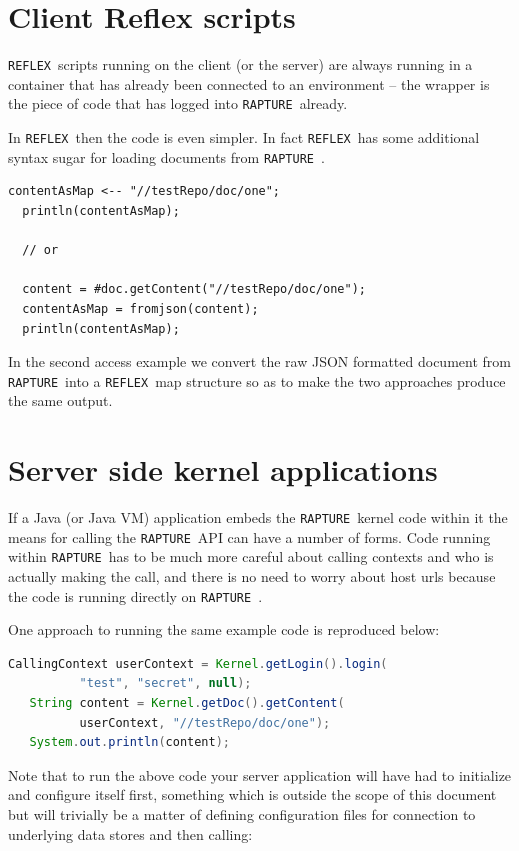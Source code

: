 \documentclass[12pt,twoside,a4paper]{book}
\newcommand{\Rapture}{\Verb+RAPTURE+~}
\newcommand{\Reflex}{\Verb+REFLEX+~}
\begin{document}
\section{Client Reflex scripts}

\Reflex scripts running on the client (or the server) are always running in a
container that has already been connected to an environment -- the wrapper is
the piece of code that has logged into \Rapture already.

In \Reflex then the code is even simpler. In fact \Reflex has some additional
syntax sugar for loading documents from \Rapture.

\begin{lstlisting}[caption={Reflex simple example}, language=reflex]
  contentAsMap <-- "//testRepo/doc/one";
  println(contentAsMap);

  // or

  content = #doc.getContent("//testRepo/doc/one");
  contentAsMap = fromjson(content);
  println(contentAsMap);
\end{lstlisting}

In the second access example we convert the raw JSON formatted document from
\Rapture into a \Reflex map structure so as to make the two approaches produce
the same output.

\section{Server side kernel applications}

If a Java (or Java VM) application embeds the \Rapture kernel code within it the
means for calling the \Rapture API can have a number of forms. Code running within
\Rapture has to be much more careful about calling contexts and who is actually
making the call, and there is no need to worry about host urls because the code
is running directly on \Rapture.

One approach to running the same example code is reproduced below:

\begin{lstlisting}[caption={Kernel simple example}, language=Java]
   CallingContext userContext = Kernel.getLogin().login(
          "test", "secret", null);
   String content = Kernel.getDoc().getContent(
          userContext, "//testRepo/doc/one");
   System.out.println(content);
\end{lstlisting}

Note that to run the above code your server application will have had to initialize
and configure itself first, something which is outside the scope of this document
but will trivially be a matter of defining configuration files for connection to
underlying data stores and then calling:
\end{document}
